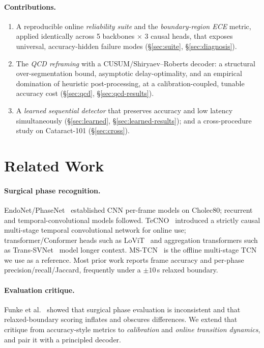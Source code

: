 \documentclass[11pt]{article}
\begin{document}
\paragraph{Contributions.}
\begin{enumerate}\itemsep0pt
\item A reproducible online \emph{reliability suite} and the \emph{boundary-region
ECE} metric, applied identically across 5 backbones $\times$ 3 causal heads, that
exposes universal, accuracy-hidden failure modes (\S\ref{sec:suite},
\S\ref{sec:diagnosis}).
\item The \emph{QCD reframing} with a CUSUM/Shiryaev--Roberts decoder: a structural
over-segmentation bound, asymptotic delay-optimality, and an empirical domination of
heuristic post-processing, at a calibration-coupled, tunable accuracy cost
(\S\ref{sec:qcd}, \S\ref{sec:qcd-results}).
\item A \emph{learned sequential detector} that preserves accuracy and low latency
simultaneously (\S\ref{sec:learned}, \S\ref{sec:learned-results}); and a
cross-procedure study on Cataract-101 (\S\ref{sec:cross}).
\end{enumerate}

\section{Related Work}
\paragraph{Surgical phase recognition.} EndoNet/PhaseNet~\cite{twinanda2017}
established CNN per-frame models on Cholec80; recurrent and temporal-convolutional
models followed. TeCNO~\cite{czempiel2020} introduced a strictly causal multi-stage
temporal convolutional network for online use; transformer/Conformer heads such as
LoViT~\cite{liu2023} and aggregation transformers such as
Trans-SVNet~\cite{gao2021} model longer context. MS-TCN~\cite{farha2019} is the
offline multi-stage TCN we use as a reference. Most prior work reports frame
accuracy and per-phase precision/recall/Jaccard, frequently under a $\pm 10$\,s
relaxed boundary.

\paragraph{Evaluation critique.} Funke et al.~\cite{funke2023} showed that surgical
phase evaluation is inconsistent and that relaxed-boundary scoring inflates and
obscures differences. We extend that critique from accuracy-style metrics to
\emph{calibration} and \emph{online transition dynamics}, and pair it with a
principled decoder.
\end{document}
